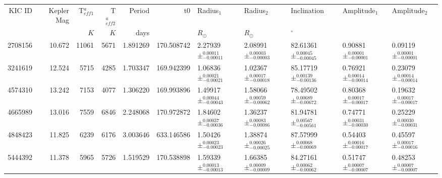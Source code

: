 \begin{sidewaystable*}
\centering

\begin{tabular}{rrrrrrlllll}
\toprule
 KIC ID &  Kepler Mag &  T$_{eff1}^a$ &  T$_{eff2}^a$ &    Period &          t0 &                         Radius$_1$ &                         Radius$_2$ &                         Inclination &                      Amplitude$_1$ &                      Amplitude$_2$ \\
 
   &  &  $K$ &  $K$ &   days &   &                         $R_\odot$ &                         $R_\odot$ &                         $^{\circ}$ &                  &                       \\
\midrule
   2708156 &            10.672 &            11061 &             5671 &  1.891269 &  170.508742 &  2.27939$\pm_{-0.00011}^{0.00011}$ &  2.08991$\pm_{-0.00003}^{0.00003}$ &  82.61361$\pm_{-0.00045}^{0.00045}$ &  0.90881$\pm_{-0.00001}^{0.00001}$ &  0.09119$\pm_{-0.00001}^{0.00001}$ \\
   3241619 &            12.524 &             5715 &             4285 &  1.703347 &  169.942399 &  1.06836$\pm_{-0.00021}^{0.00021}$ &  1.02367$\pm_{-0.00018}^{0.00017}$ &  85.17719$\pm_{-0.00136}^{0.00139}$ &  0.76921$\pm_{-0.00014}^{0.00014}$ &  0.23079$\pm_{-0.00014}^{0.00014}$ \\
   4574310 &            13.242 &             7153 &             4077 &  1.306220 &  169.993896 &  1.49917$\pm_{-0.00043}^{0.00044}$ &  1.58066$\pm_{-0.00062}^{0.00059}$ &  78.49502$\pm_{-0.00672}^{0.00689}$ &  0.80368$\pm_{-0.00017}^{0.00017}$ &  0.19632$\pm_{-0.00017}^{0.00017}$ \\
   4665989 &            13.016 &             7559 &             6846 &  2.248068 &  170.972872 &  1.84602$\pm_{-0.00036}^{0.00037}$ &  1.36237$\pm_{-0.00086}^{0.00083}$ &  81.94781$\pm_{-0.00561}^{0.00567}$ &  0.74771$\pm_{-0.00030}^{0.00031}$ &  0.25229$\pm_{-0.00031}^{0.00030}$ \\
   4848423 &            11.825 &             6239 &             6176 &  3.003646 &  633.146586 &  1.50426$\pm_{-0.00023}^{0.00023}$ &  1.38874$\pm_{-0.00025}^{0.00026}$ &  87.57999$\pm_{-0.00069}^{0.00068}$ &  0.54403$\pm_{-0.00017}^{0.00016}$ &  0.45597$\pm_{-0.00016}^{0.00017}$ \\
   5444392 &            11.378 &             5965 &             5726 &  1.519529 &  170.538898 &  1.59339$\pm_{-0.00013}^{0.00013}$ &  1.66385$\pm_{-0.00009}^{0.00009}$ &  84.27161$\pm_{-0.00062}^{0.00062}$ &  0.51747$\pm_{-0.00007}^{0.00007}$ &  0.48253$\pm_{-0.00007}^{0.00007}$ \\

\end{tabular}
\end{sidewaystable*}
